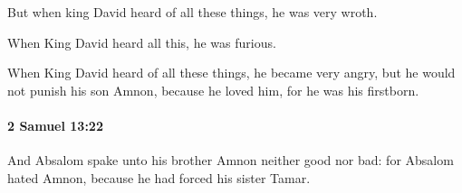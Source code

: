 			\begin{versebox}
					\item[BHS] 
					\item[ASV] But when king David heard of all these things, he was very wroth.
					\item[NIV] When King David heard all this, he was furious.
					\item[NRSV] When King David heard of all these things, he became very angry, but he would not punish his son Amnon, because he loved him, for he was his firstborn.
			\end{versebox}

		\paragraph{2 Samuel 13:22} %
			\label{2SAMUEL-13-22}

			And Absalom spake unto his brother Amnon neither good nor bad: for Absalom hated Amnon, because he had forced his sister Tamar.

